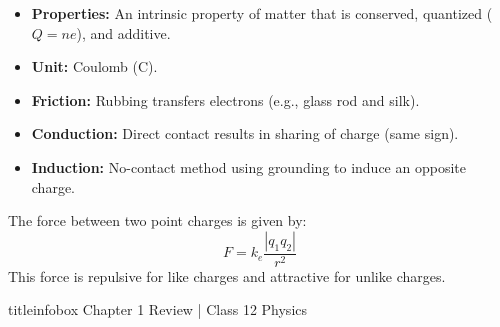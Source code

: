 \begin{frame}
\begin{frame}
\begin{keybox}
\vspace{0.1cm}
\begin{itemize}
    \item \textbf{Properties:} An intrinsic property of matter that is conserved, quantized ($Q=ne$), and additive.
    \item \textbf{Unit:} Coulomb (C).
\end{itemize}
\vspace{0.1cm}
\end{keybox}

\vspace{0.3cm}

\begin{examplebox}
\vspace{0.1cm}
\begin{itemize}
    \item \textbf{Friction:} Rubbing transfers electrons (e.g., glass rod and silk).
    \item \textbf{Conduction:} Direct contact results in sharing of charge (same sign).
    \item \textbf{Induction:} No-contact method using grounding to induce an opposite charge.
\end{itemize}
\vspace{0.1cm}
\end{examplebox}

\vspace{0.3cm}

\begin{formulabox}
\vspace{0.1cm}
The force between two point charges is given by:
\begin{equation*}
F = k_e \frac{|q_1 q_2|}{r^2}
\end{equation*}
This force is repulsive for like charges and attractive for unlike charges.
\vspace{0.1cm}
\end{formulabox}

\vfill

\begin{beamercolorbox}[wd=\textwidth,ht=0.5cm,dp=0.1cm,center]{titleinfobox}
    \small\color{coolgray} Chapter 1 Review | Class 12 Physics
\end{beamercolorbox}
\end{frame}


\end{frame}
